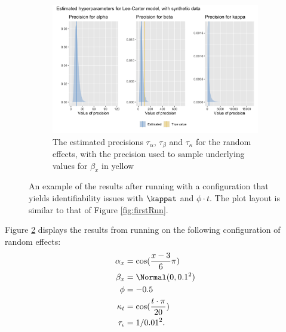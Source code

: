 \begin{figure}[h!]
    \begin{subfigure}[b]{0.6\textwidth}
        \includegraphics[width=\textwidth]{synthetic-data/Figures/hyperparameters-LC-synthetic-2-2.png}
        \caption{The estimated precisions $\tau_\alpha$, $\tau_\beta$ and $\tau_\kappa$ for the random effects, with the precision used to sample underlying values for $\beta_x$ in yellow}
        \label{fig:unidentifiabilityKappa-bottom}
    \end{subfigure}
    
    \caption{An example of the results after running \inlabru with a configuration that yields identifiability issues with $\kappat$ and $\phi \cdot t$. The plot layout is similar to that of Figure \ref{fig:firstRun}.}
    \label{fig:unidentifiabilityKappa}
\end{figure}
Figure \ref{fig:unidentifiabilityKappa} displays the results from running \inlabru on the following configuration of random effects:
\begin{equation}
    \begin{aligned}
    \alpha_x &= \cos(\frac{x-3}{6}\pi)\\
    \beta_x &= \Normal(0,0.1^2)\\
    \phi &= -0.5\\
    \kappa_t &= \cos(\frac{t\cdot \pi}{20})\\
    \tau_{\epsilon} &= 1/0.01^2.
    \end{aligned}
\end{equation}
